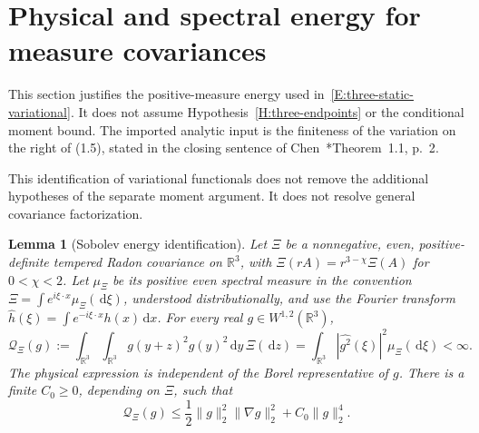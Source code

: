 \documentclass[12pt,oneside,openany]{book}
\numberwithin{equation}{section}
\newtheorem{lemma}[theorem]{Lemma}
\theoremstyle{nogostyle}
\theoremstyle{definition}
\newcommand{\R}{\mathbb{R}}
\newcommand{\ud}{\,\mathrm{d}}
\begin{document}
\section{Physical and spectral energy for measure covariances}
\label{S:energy-fidelity}

This section justifies the positive-measure energy used
in~\eqref{E:three-static-variational}. It does not assume
Hypothesis~\ref{H:three-endpoints} or the conditional moment bound. The imported
analytic input is the finiteness of the variation on the right of (1.5), stated
in the closing sentence of Chen~\cite{chen:23:exponential}*{Theorem~1.1, p.~2}.

This identification of variational functionals does not remove the additional
hypotheses of the separate moment argument. It does not resolve general
covariance factorization.

\begin{lemma}[Sobolev energy identification]\label{L:physical-spectral-energy}
  Let $\Xi$ be a nonnegative, even, positive-definite tempered Radon covariance
  on $\R^3$, with $\Xi(rA) = r^{3-\chi}\Xi(A)$ for $0 < \chi < 2$. Let $\mu_\Xi$
  be its positive even spectral measure in the convention $\Xi = \int
  e^{i\xi\cdot x}\mu_\Xi(\ud\xi)$, understood distributionally, and use the
  Fourier transform $\widehat{h}(\xi) = \int e^{-i\xi\cdot x}h(x)\ud x$. For
  every real $g \in W^{1,2}(\R^3)$,
  \begin{equation}\label{E:physical-spectral-energy}
    \mathcal{Q}_\Xi(g)
    :=\int_{\R^3}\int_{\R^3}g(y+z)^2g(y)^2\ud y\,\Xi(\ud z)
    =\int_{\R^3}|\widehat{g^2}(\xi)|^2\mu_\Xi(\ud\xi)<\infty.
  \end{equation}
  The physical expression is independent of the Borel representative of $g$.
  There is a finite $C_0 \ge 0$, depending on $\Xi$, such that
  \begin{equation}\label{E:energy-quartic-bound}
    \mathcal{Q}_\Xi(g)
    \le\frac12\|g\|_2^2\|\nabla g\|_2^2+C_0\|g\|_2^4.
  \end{equation}
\end{lemma}
\end{document}

